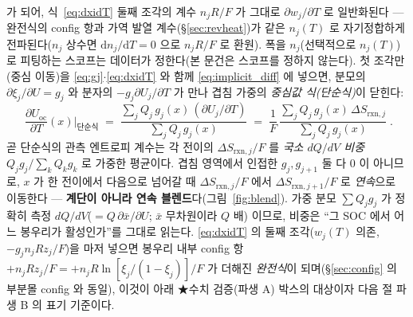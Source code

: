 \documentclass[11pt,a4paper]{article}
\newcommand{\rxn}{\mathrm{rxn}}
\newcommand{\oc}{\mathrm{oc}}
\begin{document}
가 되어, 식~\eqref{eq:dxidT} 둘째 조각의 계수 $n_jR/F$ 가 그대로 $\partial w_j/\partial T$ 로 일반화된다 --- 완전식의 config 항과
가역 발열 계수(\S\ref{sec:revheat})가 같은 $n_j(T)$ 로 자기정합하게 전파된다($n_j$ 상수면 $\mathrm{d}n_j/\mathrm{d}T{=}0$ 으로
$n_jR/F$ 로 환원). 폭을 $n_j$(선택적으로 $n_j(T)$)로 피팅하는 스코프는 데이터가 정한다(본 문건은 스코프를 정하지 않는다).
첫 조각만(중심 이동)을 \eqref{eq:gj}$\cdot$\eqref{eq:dxidT} 와 함께 \eqref{eq:implicit_diff} 에 넣으면, 분모의
$\partial\xi_j/\partial U=g_j$ 와 분자의 $-g_j\partial U_j/\partial T$ 가 만나 겹침 가중의 \emph{중심값 식(단순식)}이
닫힌다:
\begin{equation}
\boxed{\;\frac{\partial U_\oc}{\partial T}(x)\Big|_{\text{단순식}}
\;=\; \frac{\sum_j Q_j\,g_j(x)\,(\partial U_j/\partial T)}{\sum_j Q_j\,g_j(x)}
\;=\; \frac1F\,\frac{\sum_j Q_j\,g_j(x)\,\Delta S_{\rxn,j}}{\sum_j Q_j\,g_j(x)}\;.}
\label{eq:weighted}
\end{equation}
곧 단순식의 관측 엔트로피 계수는 각 전이의 $\Delta S_{\rxn,j}/F$ 를 \emph{국소 $dQ/dV$ 비중}
$Q_jg_j/\sum_k Q_kg_k$ 로 가중한 평균이다. 겹침 영역에서 인접한 $g_j,g_{j+1}$ 둘 다 0 이 아니므로, $x$ 가 한
전이에서 다음으로 넘어갈 때 $\Delta S_{\rxn,j}/F$ 에서 $\Delta S_{\rxn,j+1}/F$ 로 \emph{연속}으로 이동한다 —
\textbf{계단이 아니라 연속 블렌드}다(그림~\ref{fig:blend}). 가중 분모 $\sum Q_jg_j$ 가 정확히 측정
$dQ/dV$($=Q\,\partial\bar x/\partial U$; $\bar x$ 무차원이라 $Q$ 배)
이므로, 비중은 ``그 SOC 에서 어느 봉우리가 활성인가''를 그대로 읽는다. \eqref{eq:dxidT} 의 둘째 조각($w_j(T)$
의존, $-g_jn_jRz_j/F$)을 마저 넣으면 봉우리 내부 config 항 $+n_jR z_j/F=+n_jR\ln[\xi_j/(1-\xi_j)]/F$ 가 더해진
\emph{완전식}이 되며(\S\ref{sec:config} 의 부분몰 config 와 동일), 이것이 아래 ★수치 검증(파생 A)
박스의 대상이자 다음 절 파생 B 의 표기 기준이다.
\end{document}
